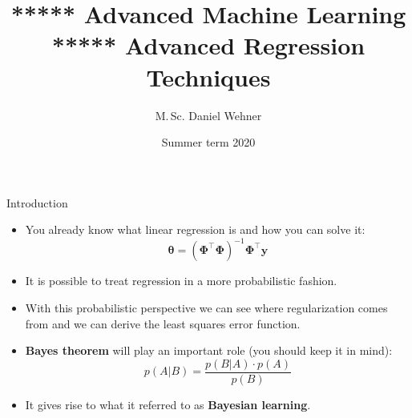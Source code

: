 




\title[Advanced Regression Techniques]{***** Advanced Machine Learning ***** Advanced Regression Techniques}
\author{M.\,Sc. Daniel Wehner}
\date{Summer term 2020}




\dwPrintTitle

\dwPrintToc


\begin{dwHeaderFrame}{Introduction}
	\begin{itemize}
		\item You already know what linear regression is and how you can solve it:
		\begin{equation}
			\bm{\theta} = (\bm{\Phi}^{\intercal} \bm{\Phi})^{-1} \bm{\Phi}^{\intercal} \bm{y}
		\end{equation}
		\item It is possible to treat regression in a more probabilistic fashion.
		\item With this probabilistic perspective we can see where regularization comes from and we can derive the least squares error function.
		\item \textbf{Bayes theorem} will play an important role (you should keep it in mind):
		\begin{equation}
			p(A \vert B) = \frac{p(B \vert A) \cdot p(A)}{p(B)}
		\end{equation}
		\item It gives rise to what it referred to as \textbf{Bayesian learning}.
	\end{itemize}
\end{dwHeaderFrame}


